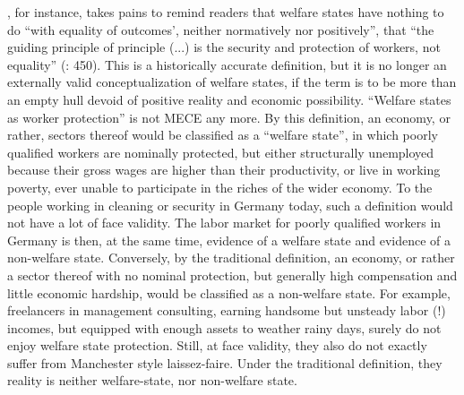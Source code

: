 \begin{enumerate}
	\citeauthor{Offe2003}, for instance, takes pains to remind readers that welfare states have nothing to do ``with equality of outcomes', neither normatively nor positively'', that ``the guiding principle of principle (...) is the security and protection of workers, not equality'' (\citeyear{Offe2003}: 450). This is a historically accurate definition, but it is no longer an externally valid conceptualization of welfare states, if the term is to be more than an empty hull devoid of positive reality and economic possibility. ``Welfare states as worker protection'' is not \gls{MECE} any more. By this definition, an economy, or rather, sectors thereof would be classified as a ``welfare state'', in which poorly qualified workers are nominally protected, but either structurally unemployed because their gross wages are higher than their productivity, or live in working poverty, ever unable to participate in the riches of the wider economy. To the people working in cleaning or security in Germany today, such a definition would not have a lot of face validity. The labor market for poorly qualified workers in Germany is then, at the same time, evidence of a welfare state and evidence of a non-welfare state. Conversely, by the traditional definition, an economy, or rather a sector thereof with no nominal protection, but generally high compensation and little economic hardship, would be classified as a non-welfare state. For example, freelancers in management consulting, earning handsome but unsteady labor (!) incomes, but equipped with enough assets to weather rainy days, surely do not enjoy welfare state protection. Still, at face validity, they also do not exactly suffer from Manchester style laissez-faire. Under the traditional definition, they reality is neither welfare-state, nor non-welfare state.
	

\end{enumerate}
